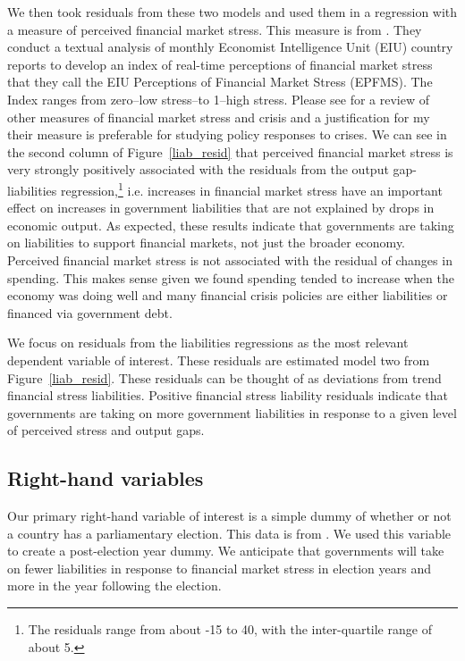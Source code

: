 \documentclass[]{article}
\begin{document}
We then took residuals from these two models and used them in a regression with a measure of perceived financial market stress. This measure is from \cite{gandrudHallEPFMS}. They conduct a textual analysis of monthly Economist Intelligence Unit (EIU) country reports to develop an index of real-time perceptions of financial market stress that they call the EIU Perceptions of Financial Market Stress (EPFMS). The Index ranges from zero--low stress--to 1--high stress. Please see \cite{gandrudHallEPFMS} for a review of other measures of financial market stress and crisis and a justification for my their measure is preferable for studying policy responses to crises. We can see in the second column of Figure~\ref{liab_resid} that perceived financial market stress is very strongly positively associated with the residuals from the output gap-liabilities regression,\footnote{The residuals range from about -15 to 40, with the inter-quartile range of about 5.} i.e. increases in financial market stress have an important effect on increases in government liabilities that are not explained by drops in economic output. As expected, these results indicate that governments are taking on liabilities to support financial markets, not just the broader economy. Perceived financial market stress is not associated with the residual of changes in spending. This makes sense given we found spending tended to increase when the economy was doing well and many financial crisis policies are either liabilities or financed via government debt.

We focus on residuals from the liabilities regressions as the most relevant dependent variable of interest. These residuals are estimated model two from Figure~\ref{liab_resid}. These residuals can be thought of as deviations from trend financial stress liabilities. Positive financial stress liability residuals indicate that governments are taking on more government liabilities in response to a given level of perceived stress and output gaps.

\subsection*{Right-hand variables}

Our primary right-hand variable of interest is a simple dummy of whether or not a country has a parliamentary election. This data is from \cite{Kayser2015comp}. We used this variable to create a post-election year dummy. We anticipate that governments will take on fewer liabilities in response to financial market stress in election years and more in the year following the election.
\end{document}
